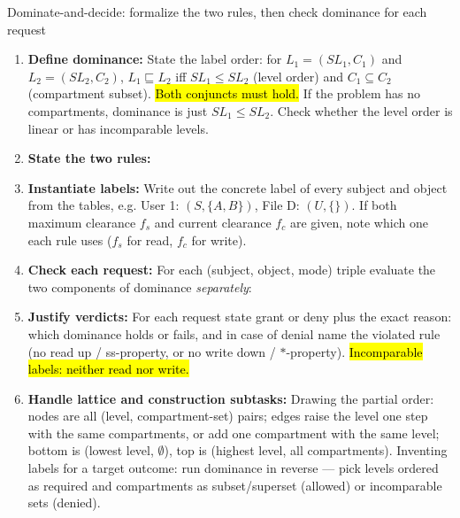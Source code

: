 \documentclass[12pt, a4paper]{article}
\newcommand{\imp}[1]{\hl{#1}}                       %
\begin{document}
\begin{schemebox}{Dominate-and-decide: formalize the two rules, then check dominance for each request}
\begin{enumerate}[label=\textbf{Step \arabic*:}, leftmargin=*]
    \item \textbf{Define dominance:} State the label order: for $L_1 = (SL_1, C_1)$ and $L_2 = (SL_2, C_2)$, $L_1 \sqsubseteq L_2$ iff $SL_1 \leq SL_2$ (level order) and $C_1 \subseteq C_2$ (compartment subset). \imp{Both conjuncts must hold.} If the problem has no compartments, dominance is just $SL_1 \leq SL_2$. Check whether the level order is linear or has incomparable levels.
    \item \textbf{State the two rules:} 
    \item \textbf{Instantiate labels:} Write out the concrete label of every subject and object from the tables, e.g. User 1: $(S, \{A, B\})$, File D: $(U, \{\})$. If both maximum clearance $f_s$ and current clearance $f_c$ are given, note which one each rule uses ($f_s$ for read, $f_c$ for write).
    \item \textbf{Check each request:} For each (subject, object, mode) triple evaluate the two components of dominance \emph{separately}:
    \item \textbf{Justify verdicts:} For each request state grant or deny plus the exact reason: which dominance holds or fails, and in case of denial name the violated rule (no read up / ss-property, or no write down / $*$-property). \imp{Incomparable labels: neither read nor write.}
    \item \textbf{Handle lattice and construction subtasks:} Drawing the partial order: nodes are all (level, compartment-set) pairs; edges raise the level one step with the same compartments, or add one compartment with the same level; bottom is (lowest level, $\emptyset$), top is (highest level, all compartments). Inventing labels for a target outcome: run dominance in reverse --- pick levels ordered as required and compartments as subset/superset (allowed) or incomparable sets (denied).
\end{enumerate}
\end{schemebox}
\end{document}
